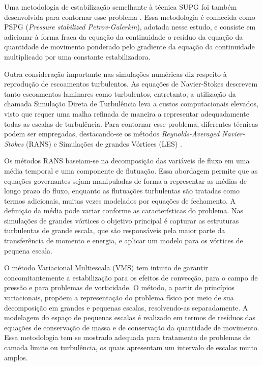 \documentclass[tese_patricia.tex]{subfiles}
\begin{document}
Uma metodologia de estabilização semelhante à técnica SUPG foi também desenvolvida para contornar esse problema \cite{HughesFB:1986,TezduyarMRS:1992a}. Essa metodologia é conhecida como PSPG (\textit{Pressure stabilized Petrov-Galerkin}), adotada nesse estudo, e consiste em adicionar à forma fraca da equação da continuidade o resíduo da equação da quantidade de movimento ponderado pelo gradiente da equação da continuidade multiplicado por uma constante estabilizadora. 

Outra consideração importante nas simulações numéricas diz respeito à reprodução de escoamentos turbulentos. As equações de Navier-Stokes descrevem tanto escoamentos laminares como turbulentos, entretanto, a utilização da chamada Simulação Direta de Turbulência leva a custos computacionais elevados, visto que requer uma malha refinada de maneira a representar adequadamente todas as escalas de turbulência. Para contornar esse problema, diferentes técnicas podem ser empregadas, destacando-se os métodos \textit{Reynolds-Averaged Navier-Stokes} (RANS) \cite{Speziale1991,Alfonsi2009} e Simulações de grandes Vórtices (LES) \cite{LaunderS:1972,Germano1991,Wilcox:1993,PIOMELLI1999}.

Os métodos RANS baseiam-se na decomposição das variáveis de fluxo em uma média temporal e uma componente de flutuação. Essa abordagem permite que as equações governantes sejam manipuladas de forma a representar as médias de longo prazo do fluxo, enquanto as flutuações turbulentas são tratadas como termos adicionais, muitas vezes modelados por equações de fechamento. A definição da média pode variar conforme as características do problema. Nas simulações de grandes vórtices o objetivo principal é capturar as estruturas turbulentas de grande escala, que são responsáveis pela maior parte da transferência de momento e energia, e aplicar um modelo para os vórtices de pequena escala. 

O método Variacional Multiescala (VMS) \cite{Hughes:1995,Hughesetal:1998,Hughesetal:2001,BazilevsTT:2013} tem intuito de garantir concomitantemente a estabilização para os efeitos de convecção, para o campo de pressão e para problemas de vorticidade. O método, a partir de princípios variacionais, propõem a representação do problema físico por meio de sua decomposição em grandes e pequenas escalas, resolvendo-as separadamente.  A modelagem do espaço de pequenas escalas é realizado em termos de resíduos das equações de conservação de massa e de conservação da quantidade de movimento. Essa metodologia tem se mostrado adequada para tratamento de problemas de camada limite ou turbulência, os quais apresentam um intervalo de escalas muito amplos.
\end{document}
